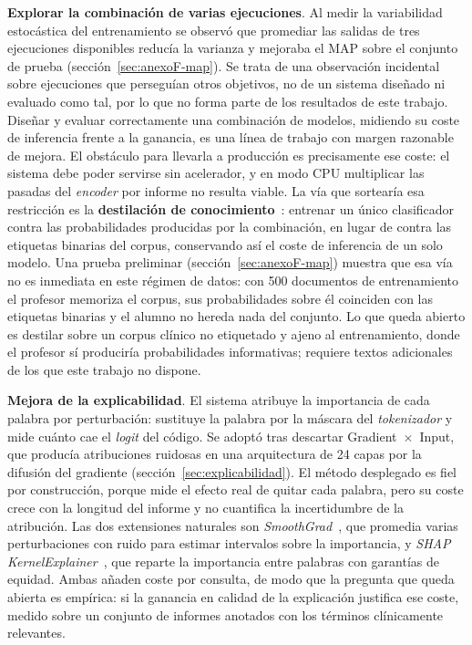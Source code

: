 \textbf{Explorar la combinación de varias ejecuciones}. Al medir la variabilidad estocástica del entrenamiento se observó que promediar las salidas de tres ejecuciones disponibles reducía la varianza y mejoraba el MAP sobre el conjunto de prueba (sección~\ref{sec:anexoF-map}). Se trata de una observación incidental sobre ejecuciones que perseguían otros objetivos, no de un sistema diseñado ni evaluado como tal, por lo que no forma parte de los resultados de este trabajo. Diseñar y evaluar correctamente una combinación de modelos, midiendo su coste de inferencia frente a la ganancia, es una línea de trabajo con margen razonable de mejora. El obstáculo para llevarla a producción es precisamente ese coste: el sistema debe poder servirse sin acelerador, y en modo CPU multiplicar las pasadas del \emph{encoder} por informe no resulta viable. La vía que sortearía esa restricción es la \textbf{destilación de conocimiento}~\cite{hinton2015distilling}: entrenar un único clasificador contra las probabilidades producidas por la combinación, en lugar de contra las etiquetas binarias del corpus, conservando así el coste de inferencia de un solo modelo. Una prueba preliminar (sección~\ref{sec:anexoF-map}) muestra que esa vía no es inmediata en este régimen de datos: con 500 documentos de entrenamiento el profesor memoriza el corpus, sus probabilidades sobre él coinciden con las etiquetas binarias y el alumno no hereda nada del conjunto. Lo que queda abierto es destilar sobre un corpus clínico no etiquetado y ajeno al entrenamiento, donde el profesor sí produciría probabilidades informativas; requiere textos adicionales de los que este trabajo no dispone.

\textbf{Mejora de la explicabilidad}. El sistema atribuye la importancia de cada palabra por perturbación: sustituye la palabra por la máscara del \emph{tokenizador} y mide cuánto cae el \emph{logit} del código. Se adoptó tras descartar Gradient~$\times$~Input, que producía atribuciones ruidosas en una arquitectura de 24 capas por la difusión del gradiente (sección~\ref{sec:explicabilidad}). El método desplegado es fiel por construcción, porque mide el efecto real de quitar cada palabra, pero su coste crece con la longitud del informe y no cuantifica la incertidumbre de la atribución. Las dos extensiones naturales son \emph{SmoothGrad}~\cite{Smilkov17}, que promedia varias perturbaciones con ruido para estimar intervalos sobre la importancia, y \emph{SHAP KernelExplainer}~\cite{Lundberg17}, que reparte la importancia entre palabras con garantías de equidad. Ambas añaden coste por consulta, de modo que la pregunta que queda abierta es empírica: si la ganancia en calidad de la explicación justifica ese coste, medido sobre un conjunto de informes anotados con los términos clínicamente relevantes.

